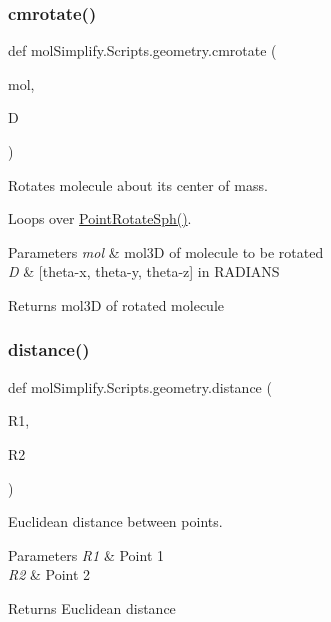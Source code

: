 \subsubsection{\texorpdfstring{cmrotate()}{cmrotate()}}
{\footnotesize\ttfamily def mol\+Simplify.\+Scripts.\+geometry.\+cmrotate (\begin{DoxyParamCaption}\item[{}]{mol,  }\item[{}]{D }\end{DoxyParamCaption})}



Rotates molecule about its center of mass. 

Loops over \hyperlink{namespacemolSimplify_1_1Scripts_1_1geometry_aeacb625442bc7c0d1d4fac98696a0cb1}{Point\+Rotate\+Sph()}. 
\begin{DoxyParams}{Parameters}
{\em mol} & mol3D of molecule to be rotated \\
\hline
{\em D} & \mbox{[}theta-\/x, theta-\/y, theta-\/z\mbox{]} in R\+A\+D\+I\+A\+NS \\
\hline
\end{DoxyParams}
\begin{DoxyReturn}{Returns}
mol3D of rotated molecule 
\end{DoxyReturn}
\mbox{\label{namespacemolSimplify_1_1Scripts_1_1geometry_a862dd678e349d0608d2568670e1b7200}} 
\subsubsection{\texorpdfstring{distance()}{distance()}}
{\footnotesize\ttfamily def mol\+Simplify.\+Scripts.\+geometry.\+distance (\begin{DoxyParamCaption}\item[{}]{R1,  }\item[{}]{R2 }\end{DoxyParamCaption})}



Euclidean distance between points. 


\begin{DoxyParams}{Parameters}
{\em R1} & Point 1 \\
\hline
{\em R2} & Point 2 \\
\hline
\end{DoxyParams}
\begin{DoxyReturn}{Returns}
Euclidean distance 
\end{DoxyReturn}
\mbox{\label{namespacemolSimplify_1_1Scripts_1_1geometry_a5bfdcb82216f2f334bdf30542cd168bf}} 
